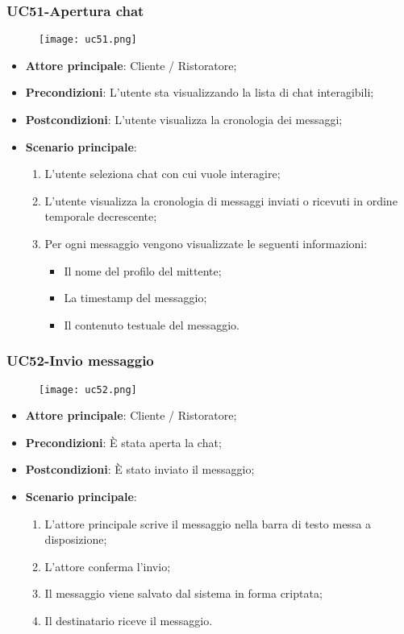 \pagebreak

\subsubsection{UC51-Apertura chat}
\begin{figure}[h] \texttt{[image: uc51.png]} \end{figure}

\begin{itemize}
\item \textbf{Attore principale}: Cliente / Ristoratore;
\item \textbf{Precondizioni}: L'utente sta visualizzando la lista di chat interagibili;
\item \textbf{Postcondizioni}: L'utente visualizza la cronologia dei messaggi;
\item \textbf{Scenario principale}:
\begin{enumerate}
\item L'utente seleziona chat con cui vuole interagire;
\item L'utente visualizza la cronologia di messaggi inviati o ricevuti in ordine temporale decrescente;
\item Per ogni messaggio vengono visualizzate le seguenti informazioni:
\begin{itemize}
\item Il nome del profilo del mittente;
\item La timestamp del messaggio;
\item Il contenuto testuale del messaggio.
\end{itemize}
\end{enumerate}
\end{itemize}

\subsubsection{UC52-Invio messaggio}
\begin{figure}[h] \texttt{[image: uc52.png]} \end{figure}

\begin{itemize}
\item \textbf{Attore principale}: Cliente / Ristoratore;
\item \textbf{Precondizioni}: È stata aperta la chat;
\item \textbf{Postcondizioni}: È stato inviato il messaggio;
\item \textbf{Scenario principale}:
\begin{enumerate}
\item L'attore principale scrive il messaggio nella barra di testo messa a disposizione;
\item L'attore conferma l'invio;
\item Il messaggio viene salvato dal sistema in forma criptata;
\item Il destinatario riceve il messaggio.
\end{enumerate}
\end{itemize}
